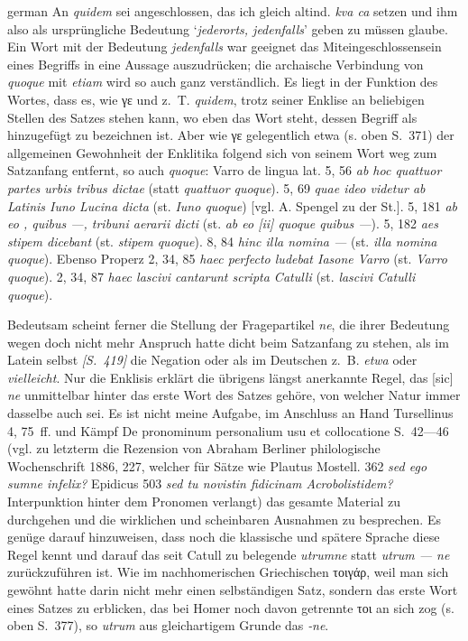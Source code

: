 \begin{otherlanguage*}{german}
An \emph{quidem} sei \emph{} angeschlossen, das ich gleich altind. \emph{kva ca} setzen und ihm also als ursprüngliche Bedeutung ‘\emph{jederorts, jedenfalls}’ geben zu müssen glaube. Ein Wort mit der Bedeutung \emph{jedenfalls} war geeignet das Miteingeschlossensein eines Begriffs in eine Aussage auszudrücken; die archaische Verbindung von \emph{quoque} mit \emph{etiam} wird so auch ganz verständlich. Es liegt in der Funktion des Wortes, dass es, wie γε und z.~T. \emph{quidem}, trotz seiner Enklise an beliebigen Stellen des Satzes stehen kann, wo eben das Wort steht, dessen Begriff als hinzugefügt zu bezeichnen ist. Aber wie γε gelegentlich etwa (s. oben S.~371) der allgemeinen Gewohnheit der Enklitika folgend sich von seinem Wort weg zum Satzanfang entfernt, so auch \emph{quoque}: Varro de lingua lat. 5, 56 \emph{ab hoc  quattuor partes urbis tribus dictae} (statt \emph{quattuor quoque}). 5, 69 \emph{quae ideo  videtur ab Latinis Iuno Lucina dicta} (st. \emph{Iuno quoque}) [vgl. A. Spengel zu der St.]. 5, 181 \emph{ab eo , quibus —, tribuni aerarii dicti} (st. \emph{ab eo [ii] quoque quibus —}). 5, 182 \emph{aes  stipem dicebant} (st. \emph{stipem quoque}). 8, 84 \emph{hinc  illa nomina —} (st. \emph{illa nomina quoque}). Ebenso Properz 2, 34, 85 \emph{haec  perfecto ludebat Iasone Varro} (st. \emph{Varro quoque}). 2, 34, 87 \emph{haec  lascivi cantarunt scripta Catulli} (st. \emph{lascivi Catulli quoque}).

Bedeutsam scheint ferner die Stellung der Fragepartikel \emph{ne}, die ihrer Bedeutung wegen doch nicht mehr Anspruch hatte dicht beim Satzanfang zu stehen, als im Latein selbst \hypertarget{p419}{\emph{[S.~419]}}\label{p419} die Negation oder als im Deutschen z.~B. \emph{etwa} oder \emph{vielleicht}. Nur die Enklisis erklärt die übrigens längst anerkannte Regel, das [sic] \emph{ne} unmittelbar hinter das erste Wort des Satzes gehöre, von welcher Natur immer dasselbe auch sei. Es ist nicht meine Aufgabe, im Anschluss an Hand Tursellinus 4, 75~ff. und Kämpf De pronominum personalium usu et collocatione S.~42—46 (vgl. zu letzterm die Rezension von Abraham Berliner philologische Wochenschrift 1886, 227, welcher für Sätze wie Plautus Mostell. 362 \emph{sed ego sumne infelix?} Epidicus 503 \emph{sed tu novistin fidicinam Acrobolistidem?} Interpunktion hinter dem Pronomen verlangt) das gesamte Material zu durchgehen und die wirklichen und scheinbaren Ausnahmen zu besprechen. Es genüge darauf hinzuweisen, dass noch die klassische und spätere Sprache diese Regel kennt und darauf das seit Catull zu belegende \emph{utrumne} statt \emph{utrum — ne} zurückzuführen ist. Wie im nachhomerischen Griechischen τοιγάρ, weil man sich gewöhnt hatte darin nicht mehr einen selbständigen Satz, sondern das erste Wort eines Satzes zu erblicken, das bei Homer noch davon getrennte τοι an sich zog (s. oben S.~377), so \emph{utrum} aus gleichartigem Grunde das \emph{‑ne}.


\end{otherlanguage*}
